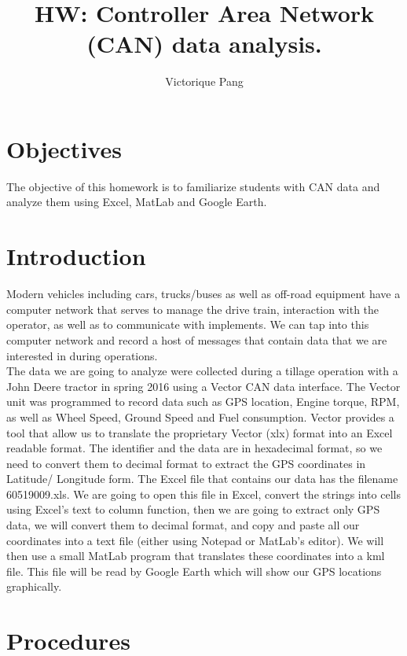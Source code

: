 \documentclass[12pt,letterpaper]{article}
\author{Victorique Pang}
\title{HW: Controller Area Network (CAN) data analysis.}
\begin{document}
\maketitle

\section{Objectives}
The objective of this homework is to familiarize students with CAN data and analyze them using Excel, MatLab and Google Earth. 

\section{Introduction}
Modern vehicles including cars, trucks/buses as well as off-road equipment have a computer network that serves to manage the drive train, interaction with the operator, as well as to communicate with implements. We can tap into this computer network and record a host of messages that contain data that we are interested in during operations.\\

The data we are going to analyze were collected during a tillage operation with a John Deere tractor in spring 2016 using a Vector CAN data interface. The Vector unit was programmed to record data such as GPS location, Engine torque, RPM, as well as Wheel Speed, Ground Speed and Fuel consumption. Vector provides a tool that allow us to translate the proprietary Vector (xlx) format into an Excel readable format. The identifier and the data are in hexadecimal format, so we need to convert them to decimal format to extract the GPS coordinates in Latitude/ Longitude form. The Excel file that contains our data has the filename 60519009.xls. We are going to open this file in Excel, convert the strings into cells using Excel's text to column function, then we are going to extract only GPS data, we will convert them to decimal format, and copy and paste all our coordinates into a text file (either using Notepad or MatLab's editor). We will then use a small MatLab program that translates these coordinates into a kml file. This file will be read by Google Earth which will show our GPS locations graphically.\\

\section{Procedures}
\end{document}
